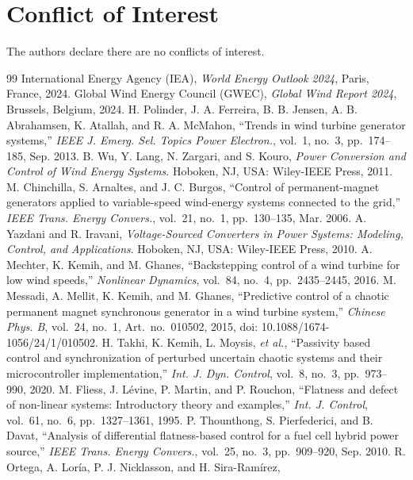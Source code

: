 \documentclass[conference]{IEEEtran}
\begin{document}
\section*{Conflict of Interest}
The authors declare there are no conflicts of interest.

\begin{thebibliography}{99}
 International Energy Agency (IEA), \emph{World Energy Outlook 2024}, Paris, France, 2024.
 Global Wind Energy Council (GWEC), \emph{Global Wind Report 2024}, Brussels, Belgium, 2024.
 H. Polinder, J. A. Ferreira, B. B. Jensen, A. B. Abrahamsen, K. Atallah, and
R. A. McMahon, ``Trends in wind turbine generator systems,'' \emph{IEEE J. Emerg. Sel. Topics Power
Electron.}, vol.~1, no.~3, pp.~174--185, Sep. 2013.
 B. Wu, Y. Lang, N. Zargari, and S. Kouro, \emph{Power Conversion and Control of Wind
Energy Systems}. Hoboken, NJ, USA: Wiley-IEEE Press, 2011.
 M. Chinchilla, S. Arnaltes, and J. C. Burgos, ``Control of permanent-magnet
generators applied to variable-speed wind-energy systems connected to the grid,'' \emph{IEEE Trans.
Energy Convers.}, vol.~21, no.~1, pp.~130--135, Mar. 2006.
 A. Yazdani and R. Iravani, \emph{Voltage-Sourced Converters in Power Systems:
Modeling, Control, and Applications}. Hoboken, NJ, USA: Wiley-IEEE Press, 2010.
 A. Mechter, K. Kemih, and M. Ghanes, ``Backstepping control of a wind turbine for
low wind speeds,'' \emph{Nonlinear Dynamics}, vol.~84, no.~4, pp.~2435--2445, 2016.
 M. Messadi, A. Mellit, K. Kemih, and M. Ghanes, ``Predictive control of a chaotic
permanent magnet synchronous generator in a wind turbine system,'' \emph{Chinese Phys. B}, vol.~24,
no.~1, Art.~no.~010502, 2015, doi: 10.1088/1674-1056/24/1/010502.
 H. Takhi, K. Kemih, L. Moysis, \emph{et al.}, ``Passivity based control and
synchronization of perturbed uncertain chaotic systems and their microcontroller implementation,''
\emph{Int. J. Dyn. Control}, vol.~8, no.~3, pp.~973--990, 2020.
 M. Fliess, J. L\'evine, P. Martin, and P. Rouchon, ``Flatness and defect of
non-linear systems: Introductory theory and examples,'' \emph{Int. J. Control}, vol.~61, no.~6,
pp.~1327--1361, 1995.
 P. Thounthong, S. Pierfederici, and B. Davat, ``Analysis of differential
flatness-based control for a fuel cell hybrid power source,'' \emph{IEEE Trans. Energy Convers.},
vol.~25, no.~3, pp.~909--920, Sep. 2010.
 R. Ortega, A. Lor\'ia, P. J. Nicklasson, and H. Sira-Ram\'irez,

\end{thebibliography}
\end{document}
